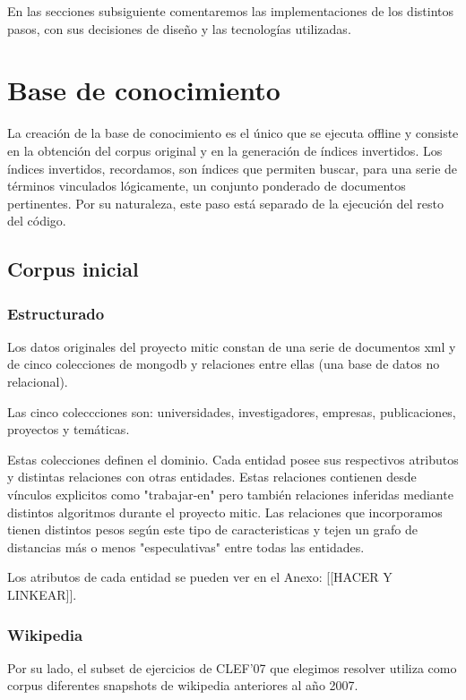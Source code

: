 En las secciones subsiguiente comentaremos las implementaciones de los
distintos pasos, con sus decisiones de dise\~no y las tecnolog\'ias
utilizadas. 


\bigskip

\section{Base de conocimiento}
\bigskip


La creaci\'on de la base de conocimiento es el \'unico que se ejecuta offline
y consiste en la obtención del corpus original y en la generación de índices
invertidos. Los índices invertidos, recordamos, son índices que permiten
buscar, para una serie de términos vinculados lógicamente, un conjunto
ponderado de documentos pertinentes. Por su naturaleza, este paso est\'a 
separado de la ejecuci\'on del resto del c\'odigo.

\subsection{Corpus inicial}

\subsubsection{Estructurado}
Los datos originales del proyecto mitic constan de una serie de documentos 
xml y de cinco colecciones de mongodb y relaciones entre ellas (una base de datos no relacional).

Las cinco coleccciones son: universidades, investigadores, empresas,
publicaciones, proyectos y tem\'aticas.

Estas colecciones definen el dominio. Cada entidad 
posee sus respectivos atributos y distintas relaciones con otras entidades.
Estas relaciones contienen desde vínculos explicitos como "trabajar-en"
pero también relaciones inferidas mediante distintos algoritmos durante el proyecto mitic.
Las relaciones que incorporamos tienen distintos pesos según este tipo de caracteristicas
y tejen un grafo de distancias más o menos "especulativas" entre todas las entidades.

Los atributos de cada entidad se pueden ver en el Anexo: [[HACER Y LINKEAR]].

\subsubsection{Wikipedia}
Por su lado, el subset de ejercicios de CLEF'07 que elegimos resolver
utiliza como corpus diferentes snapshots de wikipedia anteriores al año 2007.

